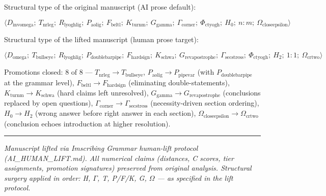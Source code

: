 \documentclass[12pt,a4paper]{article}
\begin{document}
Structural type of the original manuscript (AI prose default):


\[\langle D_{\text{invomega}};\ T_{\text{nrleg}};\ R_{\text{lyoghlig}};\ P_{\text{aolig}};\ F_{\text{beltl}};\ K_{\text{turnm}};\ G_{\text{gamma}};\ \Gamma_{\text{corner}};\ \Phi_{\text{ctyogh}};\ H_0;\ n{:}m;\ \Omega_{\text{closeepsilon}} \rangle\]

Structural type of the lifted manuscript (human prose target):


\[\langle D_{\text{omega}};\ T_{\text{bullseye}};\ R_{\text{lyoghlig}};\ P_{\text{doublebarpipe}};\ F_{\text{hardsign}};\ K_{\text{schwa}};\ G_{\text{revapostrophe}};\ \Gamma_{\text{secstress}};\ \Phi_{\text{ctyogh}};\ H_2;\ 1{:}1;\ \Omega_{\text{crtwo}} \rangle\]

Promotions closed: 8 of 8 --- $T_{\text{nrleg}} \to T_{\text{bullseye}}$, $P_{\text{aolig}} \to P_{\text{pipevar}}$ (with $P_{\text{doublebarpipe}}$ at the grammar level), $F_{\text{beltl}} \to F_{\text{hardsign}}$ (eliminating double-statements), $K_{\text{turnm}} \to K_{\text{schwa}}$ (hard claims left unresolved), $G_{\text{gamma}} \to G_{\text{revapostrophe}}$ (conclusions replaced by open questions), $\Gamma_{\text{corner}} \to \Gamma_{\text{secstress}}$ (necessity-driven section ordering), $H_0 \to H_2$ (wrong answer before right answer in each section), $\Omega_{\text{closeepsilon}} \to \Omega_{\text{crtwo}}$ (conclusion echoes introduction at higher resolution).

\begin{center}
\rule{0.5\textwidth}{0.4pt}
\end{center}

\emph{Manuscript lifted via Imscribing Grammar human-lift protocol (AI\_HUMAN\_LIFT.md). All numerical claims (distances, C scores, tier assignments, promotion signatures) preserved from original analysis. Structural surgery applied in order: H, $\Gamma$, T, P/F/K, G, $\Omega$ --- as specified in the lift protocol.}
\end{document}
